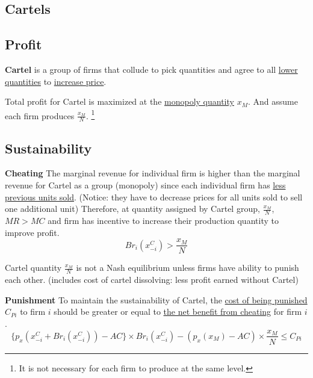 \documentclass[]{article}
\begin{document}
        \subsection{Cartels}
            \subsection{Profit}
                \begin{definition}
                    \textbf{Cartel} is a group of firms that collude to pick quantities and agree to all \ul{lower quantities} to \ul{increase price}.
                \end{definition}
                
                \begin{remark}
                    Total profit for Cartel is maximized at the \ul{monopoly quantity} $x_M$. And assume each firm produces $\frac{x_M}{N}$. \footnote{It is not necessary for each firm to produce at the same level.}
                \end{remark}
                
            \subsection{Sustainability}
                \begin{remark} \textbf{Cheating}
                    The marginal revenue for individual firm is higher than the marginal revenue for Cartel as a group (monopoly) since each individual firm has \ul{less previous units sold}. (Notice: they have to decrease prices for all units sold to sell one additional unit) Therefore, at quantity assigned by Cartel group, $\frac{x_M}{N}$, $MR > MC$ and firm has incentive to increase their production quantity to improve profit. 
                    \[
                        Br_i(x_{-i}^C) > \frac{x_M}{N}
                    \]
                \end{remark}
                
                \begin{remark}
                    Cartel quantity $\frac{x_M}{N}$ is not a Nash equilibrium unless firms have ability to punish each other. (includes cost of cartel dissolving: less profit earned without Cartel)
                \end{remark}
                
                \begin{remark} \textbf{Punishment}
                    To maintain the sustainability of Cartel, the \ul{cost of being punished}$C_{Pi}$ to firm $i$ should be greater or equal to \ul{the net benefit from cheating} for firm $i$.
                    \[
                        \big \{ p_x(x_{-i}^C + Br_i(x_{-i}^C)) - AC \big \} \times Br_i(x_{-i}^C) - (p_x(x_M) - AC) \times \frac{x_M}{N} \leq C_{Pi}
                    \]
                \end{remark}
\end{document}
